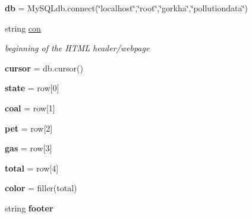 \begin{DoxyCompactItemize}
\item 
{\bfseries db} = My\+S\+Q\+Ldb.\+connect(\char`\"{}localhost\char`\"{},\char`\"{}root\char`\"{},\char`\"{}gorkha\char`\"{},\char`\"{}pollutiondata\char`\"{})\hypertarget{namespacemain3_a68c1e7f43ee01f32d528910d99eff15a}{}\label{namespacemain3_a68c1e7f43ee01f32d528910d99eff15a}

\item 
string \hyperlink{namespacemain3_a67dfd4e4e86a2deceff99ba3615b2034}{con}\hypertarget{namespacemain3_a67dfd4e4e86a2deceff99ba3615b2034}{}\label{namespacemain3_a67dfd4e4e86a2deceff99ba3615b2034}

\begin{DoxyCompactList}\small\item\em beginning of the H\+T\+ML header/webpage \end{DoxyCompactList}\item 
{\bfseries cursor} = db.\+cursor()\hypertarget{namespacemain3_ab0c1bc36089e37c54bd17a84dd1cd432}{}\label{namespacemain3_ab0c1bc36089e37c54bd17a84dd1cd432}

\item 
{\bfseries state} = row\mbox{[}0\mbox{]}\hypertarget{namespacemain3_ab4ffb335de63b73d5a944f039b16dc76}{}\label{namespacemain3_ab4ffb335de63b73d5a944f039b16dc76}

\item 
{\bfseries coal} = row\mbox{[}1\mbox{]}\hypertarget{namespacemain3_a6d8535808d1e0e96d232180700d13e38}{}\label{namespacemain3_a6d8535808d1e0e96d232180700d13e38}

\item 
{\bfseries pet} = row\mbox{[}2\mbox{]}\hypertarget{namespacemain3_aeea454359bc81f45a4b10fbe6f625a95}{}\label{namespacemain3_aeea454359bc81f45a4b10fbe6f625a95}

\item 
{\bfseries gas} = row\mbox{[}3\mbox{]}\hypertarget{namespacemain3_a106091ff5cf63b61ef5579464be10ade}{}\label{namespacemain3_a106091ff5cf63b61ef5579464be10ade}

\item 
{\bfseries total} = row\mbox{[}4\mbox{]}\hypertarget{namespacemain3_a2666a3a3d9232e0866f57a8fddb7e739}{}\label{namespacemain3_a2666a3a3d9232e0866f57a8fddb7e739}

\item 
{\bfseries color} = filler(total)\hypertarget{namespacemain3_ab9a05d76020b06c75a9c524a825328a3}{}\label{namespacemain3_ab9a05d76020b06c75a9c524a825328a3}

\item 
string {\bfseries footer}
\end{DoxyCompactItemize}


